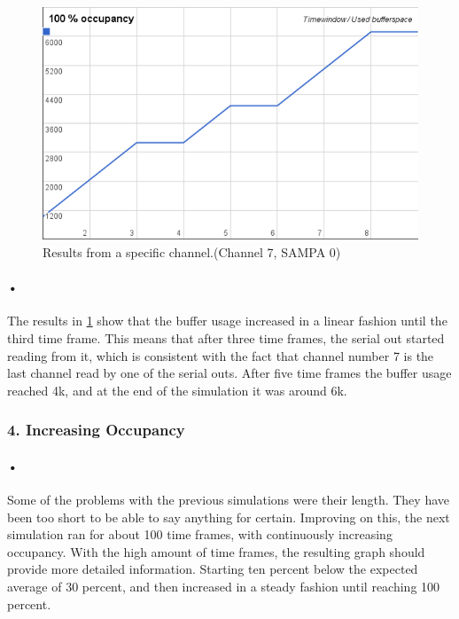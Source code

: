 \documentclass[a4paper, 12pt]{report}
\begin{document}
\begin{figure}[h!]
	\centering
		\includegraphics[width=1.0\textwidth]{images/flat-100.png}
		\caption{Results from a specific channel.(Channel 7, SAMPA 0)}
		\label{fig:flat-100}
\end{figure}

\paragraph{•} %
The results in \ref{fig:flat-100} show that the buffer usage increased in a linear fashion until the third time frame.
This means that after three time frames, the serial out started reading from it, which is consistent with the fact that channel number 7 is the last channel read by one of the serial outs.
After five time frames the buffer usage reached 4k, and at the end of the simulation it was around 6k.

\subsubsection{4. Increasing Occupancy}

\paragraph{•} %
Some of the problems with the previous simulations were their length.
They have been too short to be able to say anything for certain.
Improving on this, the next simulation ran for about 100 time frames, with continuously increasing occupancy.
With the high amount of time frames, the resulting graph should provide more detailed information.
Starting ten percent below the expected average of 30 percent, and then increased in a steady fashion until reaching 100 percent.
\end{document}
